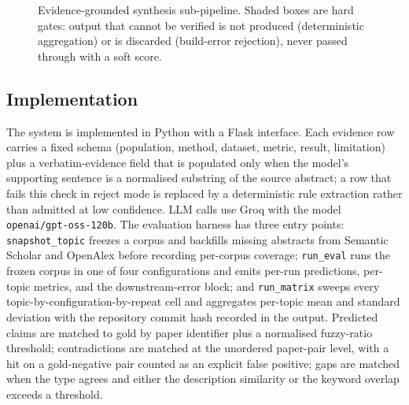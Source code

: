 \documentclass[conference]{IEEEtran}
\begin{document}
\begin{figure}[t]
\centering
{}
\caption{Evidence-grounded synthesis sub-pipeline. Shaded boxes are hard gates:
output that cannot be verified is not produced (deterministic aggregation) or is
discarded (build-error rejection), never passed through with a soft score.}
\label{fig:arch}
\end{figure}

\subsection{Implementation}
The system is implemented in Python with a Flask interface. Each evidence row
carries a fixed schema (population, method, dataset, metric, result, limitation)
plus a verbatim-evidence field that is populated only when the model's supporting
sentence is a normalised substring of the source abstract; a row that fails this
check in reject mode is replaced by a deterministic rule extraction rather than
admitted at low confidence. LLM calls use Groq with the model
\texttt{openai/gpt-oss-120b}. The evaluation harness has three entry points:
\texttt{snapshot\_topic} freezes a corpus and backfills missing abstracts from
Semantic Scholar and OpenAlex before recording per-corpus coverage;
\texttt{run\_eval} runs the frozen corpus in one of four configurations and emits
per-run predictions, per-topic metrics, and the downstream-error block; and
\texttt{run\_matrix} sweeps every topic-by-configuration-by-repeat cell and
aggregates per-topic mean and standard deviation with the repository commit hash
recorded in the output. Predicted claims are matched to gold by paper identifier
plus a normalised fuzzy-ratio threshold; contradictions are matched at the
unordered paper-pair level, with a hit on a gold-negative pair counted as an
explicit false positive; gaps are matched when the type agrees and either the
description similarity or the keyword overlap exceeds a threshold.
\end{document}
